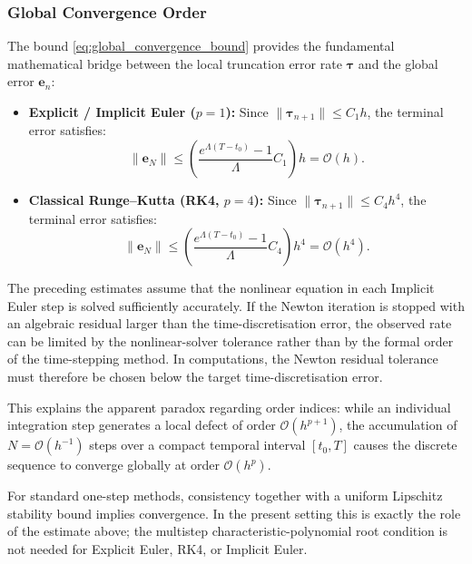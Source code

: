 \documentclass[11pt,a4paper]{article}
\theoremstyle{definition}
\theoremstyle{remark}
\begin{document}
\subsubsection{Global Convergence Order}
The bound \eqref{eq:global_convergence_bound} provides the fundamental mathematical bridge between the local truncation error rate $\boldsymbol{\tau}$ and the global error $\mathbf{e}_n$:
\begin{itemize}
    \item \textbf{Explicit / Implicit Euler ($p=1$):} Since $\|\boldsymbol{\tau}_{n+1}\| \le C_1 h$, the terminal error satisfies:
    \begin{equation}
    \label{eq:euler_global_order}
    \|\mathbf{e}_N\| \le \left( \frac{e^{\Lambda(T - t_0)} - 1}{\Lambda} C_1 \right) h = \mathcal{O}(h).
    \end{equation}
    \item \textbf{Classical Runge--Kutta (RK4, $p=4$):} Since $\|\boldsymbol{\tau}_{n+1}\| \le C_4 h^4$, the terminal error satisfies:
    \begin{equation}
    \label{eq:rk4_global_order}
    \|\mathbf{e}_N\| \le \left( \frac{e^{\Lambda(T - t_0)} - 1}{\Lambda} C_4 \right) h^4 = \mathcal{O}(h^4).
    \end{equation}
\end{itemize}
The preceding estimates assume that the nonlinear equation in each
Implicit Euler step is solved sufficiently accurately. If the Newton
iteration is stopped with an algebraic residual larger than the
time-discretisation error, the observed rate can be limited by the
nonlinear-solver tolerance rather than by the formal order of the
time-stepping method. In computations, the Newton residual tolerance
must therefore be chosen below the target time-discretisation error.

This explains the apparent paradox regarding order indices: while an individual integration step generates a local defect of order $\mathcal{O}(h^{p+1})$, the accumulation of $N = \mathcal{O}(h^{-1})$ steps over a compact temporal interval $[t_0, T]$ causes the discrete sequence to converge globally at order $\mathcal{O}(h^p)$.

For standard one-step methods, consistency together with a uniform Lipschitz stability bound implies convergence. In the present setting this is exactly the role of the estimate above; the multistep characteristic-polynomial root condition is not needed for Explicit Euler, RK4, or Implicit Euler.
\end{document}
